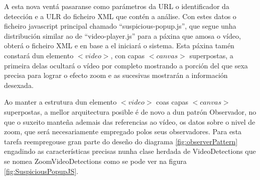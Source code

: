         A esta nova ventá pasaranse como parámetros da URL o identificador da detección e a ULR do 
        ficheiro XML que contén a análise. Con estes datos o ficheiro javascript principal chamado
        ``suspicious-popup.js'', que segue unha distribución similar ao de ``video-player.js'' para a páxina
        que amosa o vídeo, obterá o ficheiro XML e en base a el iniciará o sistema. Esta
        páxina tamén constará dun elemento $<video>$, con capas $<canvas>$ superpostas, a primeira delas 
        ocultará o vídeo por completo mostrando a porción del que sexa precisa para lograr o efecto 
        zoom e as sucesivas mostrarán a información desexada.
        
        Ao manter a estrutura dun elemento $<video>$ coas capas $<canvas>$ superpostas, a mellor 
        arquitectura posible é de novo a dun patrón Observador, no que o suxeito manteña ademais das referencias
        ao vídeo, os datos sobre o nivel de zoom, que será necesariamente empregado polos seus 
        observadores. Para esta tarefa reempregouse gran parte do deseño do diagrama \ref{fig:observerPattern}
        engadindo as características precisas nunha clase herdada de VideoDetections que se nomea 
        ZoomVideoDetections como se pode ver na figura \ref{fig:SuspiciousPopupJS}.
        
